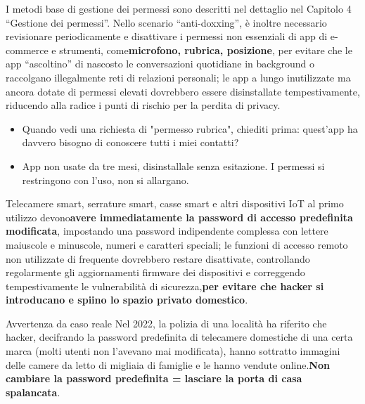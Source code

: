 
I metodi base di gestione dei permessi sono descritti nel dettaglio nel Capitolo 4 “Gestione dei permessi”. Nello scenario “anti-doxxing”, è inoltre necessario revisionare periodicamente e disattivare i permessi non essenziali di app di e-commerce e strumenti, come\textbf{microfono, rubrica, posizione}, per evitare che le app “ascoltino” di nascosto le conversazioni quotidiane in background o raccolgano illegalmente reti di relazioni personali; le app a lungo inutilizzate ma ancora dotate di permessi elevati dovrebbero essere disinstallate tempestivamente, riducendo alla radice i punti di rischio per la perdita di privacy.

\begin{itemize}
  \item Quando vedi una richiesta di "permesso rubrica", chiediti prima: quest'app ha davvero bisogno di conoscere tutti i miei contatti?
  \item App non usate da tre mesi, disinstallale senza esitazione. I permessi si restringono con l'uso, non si allargano.
\end{itemize}


Telecamere smart, serrature smart, casse smart e altri dispositivi IoT al primo utilizzo devono\textbf{avere immediatamente la password di accesso predefinita modificata}, impostando una password indipendente complessa con lettere maiuscole e minuscole, numeri e caratteri speciali; le funzioni di accesso remoto non utilizzate di frequente dovrebbero restare disattivate, controllando regolarmente gli aggiornamenti firmware dei dispositivi e correggendo tempestivamente le vulnerabilità di sicurezza,\textbf{per evitare che hacker si introducano e spiino lo spazio privato domestico}.

\begin{tcbwarn}{Avvertenza da caso reale}
Nel 2022, la polizia di una località ha riferito che hacker, decifrando la password predefinita di telecamere domestiche di una certa marca (molti utenti non l'avevano mai modificata), hanno sottratto immagini delle camere da letto di migliaia di famiglie e le hanno vendute online.\textbf{Non cambiare la password predefinita = lasciare la porta di casa spalancata}.

\end{tcbwarn}


